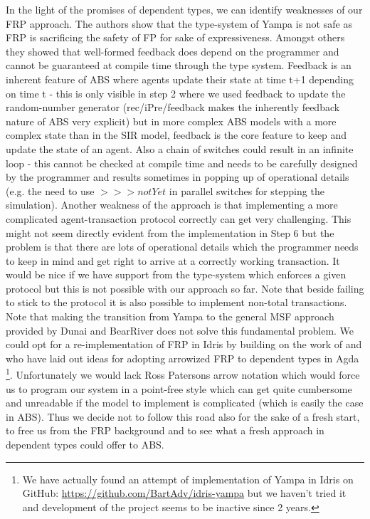 In the light of the promises of dependent types, we can identify weaknesses of our FRP approach. The authors \cite{sculthorpe_safe_2009} show that the type-system of Yampa is not safe as FRP is sacrificing the safety of FP for sake of expressiveness. Amongst others they showed that well-formed feedback does depend on the programmer and cannot be guaranteed at compile time through the type system. Feedback is an inherent feature of ABS where agents update their state at time t+1 depending on time t - this is only visible in step 2 where we used feedback to update the random-number generator (rec/iPre/feedback makes the inherently feedback nature of ABS very explicit) but in more complex ABS models with a more complex state than in the SIR model, feedback is the core feature to keep and update the state of an agent. Also a chain of switches could result in an infinite loop - this cannot be checked at compile time and needs to be carefully designed by the programmer and results sometimes in popping up of operational details (e.g. the need to use $>>> notYet$ in parallel switches for stepping the simulation). 
Another weakness of the approach is that implementing a more complicated agent-transaction protocol correctly can get very challenging. This might not seem directly evident from the implementation in Step 6 but the problem is that there are lots of operational details which the programmer needs to keep in mind and get right to arrive at a correctly working transaction. It would be nice if we have support from the type-system which enforces a given protocol but this is not possible with our approach so far. Note that beside failing to stick to the protocol it is also possible to implement non-total transactions. Note that making the transition from Yampa to the general MSF approach provided by Dunai and BearRiver does not solve this fundamental problem.
We could opt for a re-implementation of FRP in Idris by building on the work of \cite{sculthorpe_safe_2009} and \cite{jeffrey_causality_2013} who have laid out ideas for adopting arrowized FRP to dependent types in Agda \footnote{We have actually found an attempt of implementation of Yampa in Idris on GitHub: \url{https://github.com/BartAdv/idris-yampa} but we haven't tried it and development of the project seems to be inactive since 2 years.}. Unfortunately we would lack Ross Patersons \cite{paterson_new_2001} arrow notation which would force us to program our system in a point-free style which can get quite cumbersome and unreadable if the model to implement is complicated (which is easily the case in ABS). Thus we decide not to follow this road also for the sake of a fresh start, to free us from the FRP background and to see what a fresh approach in dependent types could offer to ABS.

